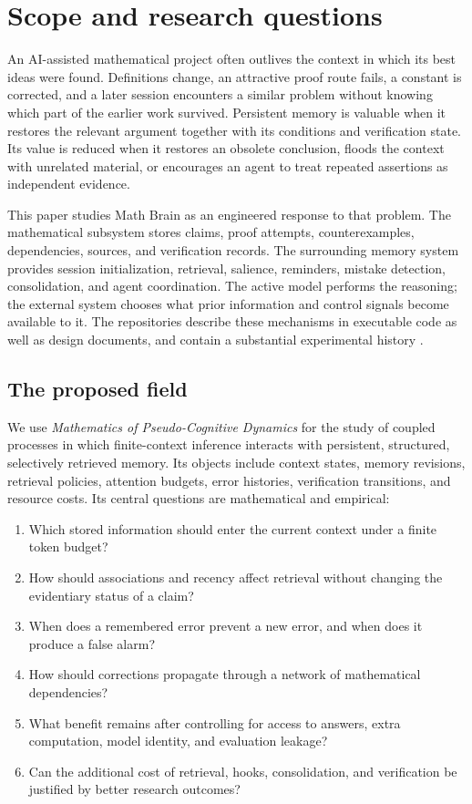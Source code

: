 \section{Scope and research questions}

An AI-assisted mathematical project often outlives the context in which its best ideas were found. Definitions change, an attractive proof route fails, a constant is corrected, and a later session encounters a similar problem without knowing which part of the earlier work survived. Persistent memory is valuable when it restores the relevant argument together with its conditions and verification state. Its value is reduced when it restores an obsolete conclusion, floods the context with unrelated material, or encourages an agent to treat repeated assertions as independent evidence.

This paper studies Math Brain as an engineered response to that problem. The mathematical subsystem stores claims, proof attempts, counterexamples, dependencies, sources, and verification records. The surrounding memory system provides session initialization, retrieval, salience, reminders, mistake detection, consolidation, and agent coordination. The active model performs the reasoning; the external system chooses what prior information and control signals become available to it. The repositories describe these mechanisms in executable code as well as design documents, and contain a substantial experimental history \citep{mathreadme,matharchitecture,broadarchitecture,canonical}.

\subsection{The proposed field}

We use \emph{Mathematics of Pseudo-Cognitive Dynamics} for the study of coupled processes in which finite-context inference interacts with persistent, structured, selectively retrieved memory. Its objects include context states, memory revisions, retrieval policies, attention budgets, error histories, verification transitions, and resource costs. Its central questions are mathematical and empirical:

\begin{enumerate}
\item Which stored information should enter the current context under a finite token budget?
\item How should associations and recency affect retrieval without changing the evidentiary status of a claim?
\item When does a remembered error prevent a new error, and when does it produce a false alarm?
\item How should corrections propagate through a network of mathematical dependencies?
\item What benefit remains after controlling for access to answers, extra computation, model identity, and evaluation leakage?
\item Can the additional cost of retrieval, hooks, consolidation, and verification be justified by better research outcomes?
\end{enumerate}

